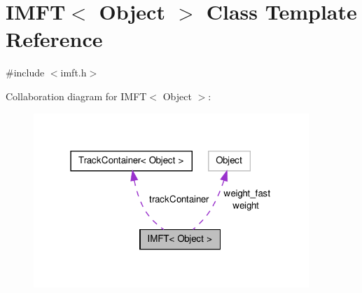 \hypertarget{class_i_m_f_t}{\section{\-I\-M\-F\-T$<$ \-Object $>$ \-Class \-Template \-Reference}
\label{class_i_m_f_t}
}


{\ttfamily \#include $<$imft.\-h$>$}



\-Collaboration diagram for \-I\-M\-F\-T$<$ \-Object $>$\-:
\nopagebreak
\begin{figure}[H]
\begin{center}
\leavevmode
\includegraphics[width=295pt]{class_i_m_f_t__coll__graph}
\end{center}
\end{figure}
